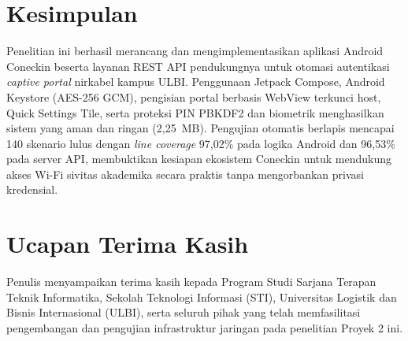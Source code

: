 \documentclass[10pt,journal,compsoc]{IEEEtran}
\begin{document}
\section{Kesimpulan}
Penelitian ini berhasil merancang dan mengimplementasikan aplikasi Android Coneckin beserta layanan REST API pendukungnya untuk otomasi autentikasi \textit{captive portal} nirkabel kampus ULBI. Penggunaan Jetpack Compose, Android Keystore (AES-256 GCM), pengisian portal berbasis WebView terkunci host, Quick Settings Tile, serta proteksi PIN PBKDF2 dan biometrik menghasilkan sistem yang aman dan ringan (2,25~MB). Pengujian otomatis berlapis mencapai 140 skenario lulus dengan \textit{line coverage} 97,02\% pada logika Android dan 96,53\% pada server API, membuktikan kesiapan ekosistem Coneckin untuk mendukung akses Wi-Fi sivitas akademika secara praktis tanpa mengorbankan privasi kredensial.

\section*{Ucapan Terima Kasih}
Penulis menyampaikan terima kasih kepada Program Studi Sarjana Terapan Teknik Informatika, Sekolah Teknologi Informasi (STI), Universitas Logistik dan Bisnis Internasional (ULBI), serta seluruh pihak yang telah memfasilitasi pengembangan dan pengujian infrastruktur jaringan pada penelitian Proyek 2 ini.



\end{document}
